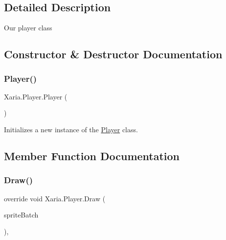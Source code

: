 \subsection{Detailed Description}
Our player class 



\subsection{Constructor \& Destructor Documentation}
\mbox{\label{classXaria_1_1Player_a86d80bfee5af015e8612cd992bf53ad0}} 
\subsubsection{\texorpdfstring{Player()}{Player()}}
{\footnotesize\ttfamily Xaria.\+Player.\+Player (\begin{DoxyParamCaption}{ }\end{DoxyParamCaption})\hspace{0.3cm}{\ttfamily [inline]}}



Initializes a new instance of the \hyperlink{classXaria_1_1Player}{Player} class. 



\subsection{Member Function Documentation}
\mbox{\label{classXaria_1_1Player_a25ddea2b9d8679ab6aa649fda6ce1f22}} 
\subsubsection{\texorpdfstring{Draw()}{Draw()}}
{\footnotesize\ttfamily override void Xaria.\+Player.\+Draw (\begin{DoxyParamCaption}\item[{ref Sprite\+Batch}]{sprite\+Batch }\end{DoxyParamCaption})\hspace{0.3cm}{\ttfamily [inline]}, {\ttfamily [virtual]}}



